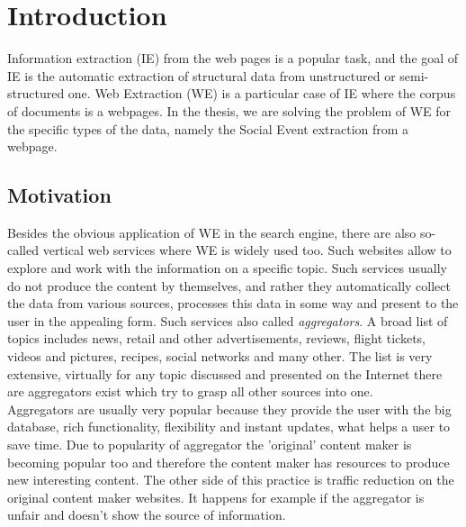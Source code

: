 \chapter{Introduction}
\label{chap:intro}
Information extraction (IE) from the web pages is a popular task, and the goal of IE is the automatic extraction of structural data from unstructured or semi-structured one. Web Extraction (WE) is a particular case of IE where the corpus of documents is a webpages. In the thesis, we are solving the problem of WE for the specific types of the data, namely the Social Event extraction from a webpage.   





\section{Motivation}
Besides the obvious application of WE in the search engine, there are also so-called vertical web services where WE is widely used too. Such websites allow to explore and work with the information on a specific topic. Such services usually do not produce the content by themselves, and rather they automatically collect the data from various sources, processes this data in some way and present to the user in the appealing form. Such services also called \textit{aggregators}. A broad list of topics includes news, retail and other advertisements, reviews, flight tickets, videos and pictures, recipes, social networks and many other. The list is very extensive, virtually for any topic discussed and presented on the Internet there are aggregators exist which try to grasp all other sources into one. \\

Aggregators are usually very popular because they provide the user with the big database, rich functionality, flexibility and instant updates, what helps a user to save time. Due to popularity of aggregator the 'original' content maker is becoming popular too and therefore the content maker has resources to produce new interesting content. The other side of this practice is traffic reduction on the original content maker websites. It happens for example if the aggregator is unfair and doesn't show the source of information. \\

